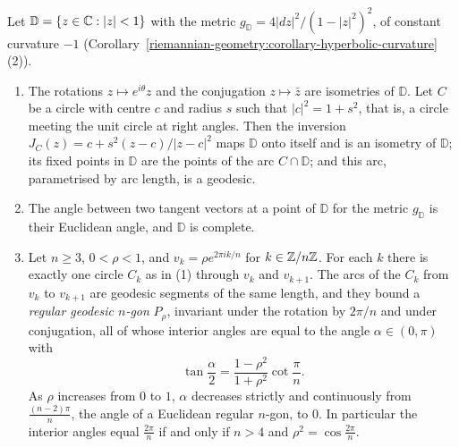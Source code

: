 \begin{lemma}\label{riemannian-geometry:lemma-regular-polygons}
Let $\mathbb{D} = \{z \in \mathbb{C} : |z| < 1\}$ with the metric $g_{\mathbb{D}} = 4|dz|^2/(1 - |z|^2)^2$, of constant curvature $-1$
(Corollary~\ref{riemannian-geometry:corollary-hyperbolic-curvature}(2)).
\begin{enumerate}
\item The rotations $z \mapsto e^{i\theta}z$ and the conjugation $z \mapsto \bar z$ are isometries of $\mathbb{D}$. Let $C$ be a circle with centre $c$ and radius $s$ such that $|c|^2 = 1 + s^2$, that is, a
circle meeting the unit circle at right angles. Then the inversion $J_C(z) = c + s^2(z - c)/|z - c|^2$ maps $\mathbb{D}$ onto itself and is an isometry of $\mathbb{D}$; its fixed points in $\mathbb{D}$ are the
points of the arc $C \cap \mathbb{D}$; and this arc, parametrised by arc length, is a geodesic.
\item The angle between two tangent vectors at a point of $\mathbb{D}$ for the metric $g_{\mathbb{D}}$ is their Euclidean angle, and $\mathbb{D}$ is complete.
\item Let $n \geq 3$, $0 < \rho < 1$, and $v_k = \rho e^{2\pi ik/n}$ for $k \in \mathbb{Z}/n\mathbb{Z}$. For each $k$ there is exactly one circle $C_k$ as in (1) through $v_k$ and $v_{k+1}$. The arcs of the $C_k$
from $v_k$ to $v_{k+1}$ are geodesic segments of the same length, and they bound a \emph{regular geodesic $n$-gon} $P_\rho$, invariant under the rotation by $2\pi/n$ and under conjugation, all of whose
interior angles are equal to the angle $\alpha \in (0, \pi)$ with
\[
\tan\frac{\alpha}{2} = \frac{1 - \rho^2}{1 + \rho^2}\cot\frac{\pi}{n} .
\]
As $\rho$ increases from $0$ to $1$, $\alpha$ decreases strictly and continuously from $\frac{(n - 2)\pi}{n}$, the angle of a Euclidean regular $n$-gon, to $0$. In particular the interior angles equal
$\frac{2\pi}{n}$ if and only if $n > 4$ and $\rho^2 = \cos\frac{2\pi}{n}$.
\end{enumerate}
\end{lemma}

